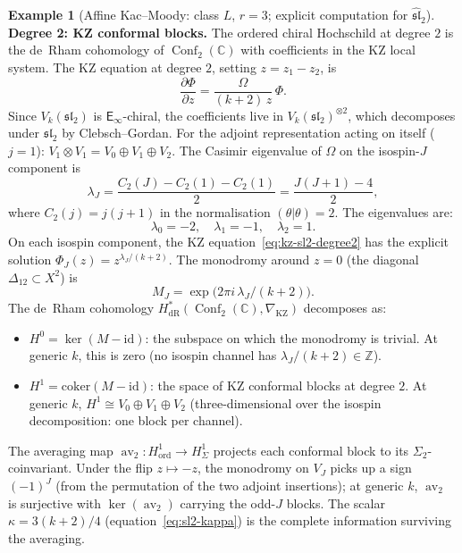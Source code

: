 \documentclass[11pt,reqno]{amsart}
\theoremstyle{definition}
\newtheorem{example}[theorem]{Example}
\theoremstyle{remark}
\newcommand{\Einf}{\mathsf{E}_{\infty}}
\DeclareMathOperator{\Conf}{Conf}
\DeclareMathOperator{\av}{av}
\newcommand{\CC}{\mathbb{C}}
\newcommand{\ZZ}{\mathbb{Z}}
\newcommand{\id}{\mathrm{id}}
\numberwithin{equation}{section}
\begin{document}
\begin{example}[Affine Kac--Moody: class $L$, $r = 3$;
explicit computation for $\widehat{\mathfrak{sl}}_2$]
\smallskip
\noindent\textbf{Degree 2: KZ conformal blocks.}
The ordered chiral Hochschild at degree $2$ is the de~Rham
cohomology of $\Conf_2(\CC)$ with coefficients in the
KZ local system. The KZ equation at degree $2$, setting
$z = z_1 - z_2$, is
\begin{equation}\label{eq:kz-sl2-degree2}
  \frac{\partial\Phi}{\partial z}
  = \frac{\Omega}{(k + 2)\,z}\,\Phi.
\end{equation}
Since $V_k(\mathfrak{sl}_2)$ is $\Einf$-chiral, the
coefficients live in
$V_k(\mathfrak{sl}_2)^{\otimes 2}$, which decomposes under
$\mathfrak{sl}_2$ by Clebsch--Gordan. For the adjoint
representation acting on itself ($j = 1$):
$V_1 \otimes V_1 = V_0 \oplus V_1 \oplus V_2$.
The Casimir eigenvalue of $\Omega$ on the isospin-$J$
component is
\begin{equation}\label{eq:kz-adj-casimir}
  \lambda_J
  = \frac{C_2(J) - C_2(1) - C_2(1)}{2}
  = \frac{J(J+1) - 4}{2},
\end{equation}
where $C_2(j) = j(j+1)$ in the normalisation
$(\theta|\theta) = 2$. The eigenvalues are:
\[
  \lambda_0 = -2,\quad \lambda_1 = -1,\quad \lambda_2 = 1.
\]
On each isospin component, the KZ
equation~\eqref{eq:kz-sl2-degree2} has the explicit solution
$\Phi_J(z) = z^{\lambda_J/(k+2)}$. The monodromy around
$z = 0$ (the diagonal $\Delta_{12} \subset X^2$) is
\[
  M_J = \exp\!\bigl(2\pi i\,\lambda_J/(k + 2)\bigr).
\]
The de~Rham cohomology $H^*_{\mathrm{dR}}(\Conf_2(\CC),
\nabla_{\mathrm{KZ}})$ decomposes as:
\begin{itemize}
\item $H^0 = \ker(M - \id)$: the subspace on which the
  monodromy is trivial. At generic $k$, this is zero
  (no isospin channel has
  $\lambda_J/(k+2) \in \ZZ$).
\item $H^1 = \mathrm{coker}(M - \id)$: the space of
  KZ conformal blocks at degree $2$. At generic $k$,
  $H^1 \cong V_0 \oplus V_1 \oplus V_2$
  (three-dimensional over the isospin decomposition:
  one block per channel).
\end{itemize}
The averaging map
$\av_2\colon H^1_{\mathrm{ord}} \to H^1_{\Sigma}$
projects each conformal block to its $\Sigma_2$-coinvariant.
Under the flip $z \mapsto -z$, the monodromy on $V_J$ picks
up a sign $(-1)^J$ (from the permutation of the two
adjoint insertions); at generic $k$, $\av_2$ is surjective
with $\ker(\av_2)$ carrying the odd-$J$ blocks.
The scalar $\kappa = 3(k+2)/4$ (equation~\eqref{eq:sl2-kappa})
is the complete information surviving the averaging.


\end{example}
\end{document}
